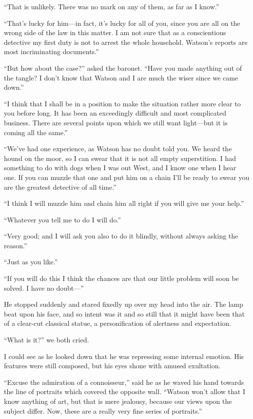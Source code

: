 \documentclass[paper=5.5in:8.5in,BCOR=7mm,twoside,DIV=calc,12pt,usegeometry,openany,chapterprefix,endperiod,headings=big]{scrbook} %
\begin{document}
\enquote{That is unlikely. There was no mark on any of them, as far as I know.}

\enquote{That's lucky for him---in fact, it's lucky for all of you, since you are all on the wrong side of the law in this matter. I am not sure that as a conscientious detective my first duty is not to arrest the whole household. Watson's reports are most incriminating documents.}

\enquote{But how about the case?} asked the baronet. \enquote{Have you made anything out of the tangle? I don't know that Watson and I are much the wiser since we came down.}

\enquote{I think that I shall be in a position to make the situation rather more clear to you before long. It has been an exceedingly difficult and most complicated business. There are several points upon which we still want light---but it is coming all the same.}

\enquote{We've had one experience, as Watson has no doubt told you. We heard the hound on the moor, so I can swear that it is not all empty superstition. I had something to do with dogs when I was out West, and I know one when I hear one. If you can muzzle that one and put him on a chain I'll be ready to swear you are the greatest detective of all time.}

\enquote{I think I will muzzle him and chain him all right if you will give me your help.}

\enquote{Whatever you tell me to do I will do.}

\enquote{Very good; and I will ask you also to do it blindly, without always asking the reason.}

\enquote{Just as you like.}

\enquote{If you will do this I think the chances are that our little problem will soon be solved. I have no doubt---}

He stopped suddenly and stared fixedly up over my head into the air. The lamp beat upon his face, and so intent was it and so still that it might have been that of a clear-cut classical statue, a personification of alertness and expectation.



\enquote{What is it?} we both cried.

I could see as he looked down that he was repressing some internal emotion. His features were still composed, but his eyes shone with amused exultation.

\enquote{Excuse the admiration of a connoisseur,} said he as he waved his hand towards the line of portraits which covered the opposite wall. \enquote{Watson won't allow that I know anything of art, but that is mere jealousy, because our views upon the subject differ. Now, these are a really very fine series of portraits.}
\end{document}

